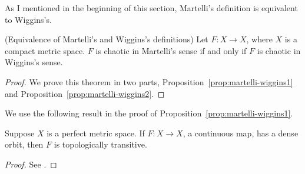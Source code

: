 \documentclass[10pt,draft,twoside]{book}
\begin{document}
As I mentioned in the beginning of this section, Martelli's definition is equivalent to Wiggins's.
\begin{theorem}
  (Equivalence of Martelli's and Wiggins's definitions)
  Let $F: X \to X$, where $X$ is a compact metric space.
  $F$ is chaotic in Martelli's sense if and only if $F$ is chaotic in Wiggins's sense.
  \label{thm:martelli-wiggins}
  \begin{proof}
    We prove this theorem in two parts, Proposition~\ref{prop:martelli-wiggins1} and Proposition~\ref{prop:martelli-wiggins2}.
  \end{proof}
\end{theorem}
We use the following result in the proof of Proposition~\ref{prop:martelli-wiggins1}.
\begin{proposition}
  \citep{silverman}
  Suppose $X$ is a perfect metric space.
  If $F: X\to X$, a continuous map, has a dense orbit, then $F$ is topologically transitive.
  \begin{proof}
    See \citep{silverman}.
  \end{proof}
  \label{lem:dob-transitivity}
\end{proposition}
\end{document}
